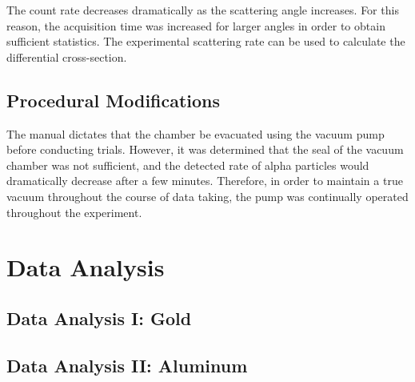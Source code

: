\documentclass[a4paper]{article}
\begin{document}
The count rate decreases dramatically as the scattering angle increases. For this reason, the acquisition time was increased for larger angles in order to obtain sufficient statistics. The experimental scattering rate can be used to calculate the differential cross-section.

\subsection{Procedural Modifications}
\qq The manual dictates that the chamber be evacuated using the vacuum pump before conducting trials. However, it was determined that the seal of the vacuum chamber was not sufficient, and the detected rate of alpha particles would dramatically decrease after a few minutes. Therefore, in order to maintain a true vacuum throughout the course of data taking, the pump was continually operated throughout the experiment.
\qq 

\section{Data Analysis}

\subsection{Data Analysis I: Gold}

\qq

\qq 

\qq 

\qq 

\qq 

\subsection{Data Analysis II: Aluminum}

\qq

\qq 

\qq 
\end{document}
